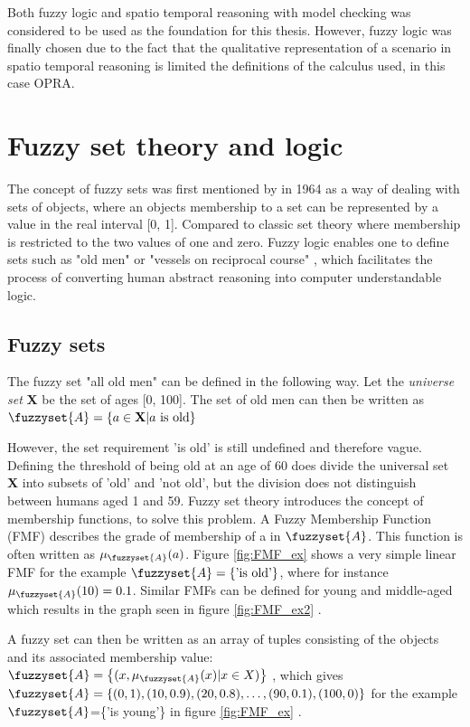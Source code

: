 Both fuzzy logic and spatio temporal reasoning with model checking was considered to be used as the foundation for this thesis. However, fuzzy logic was finally chosen due to the fact that the qualitative representation of a scenario in spatio temporal reasoning is limited the definitions of the calculus used, in this case OPRA.
\chapter{Fuzzy set theory and logic}
The concept of fuzzy sets was first mentioned by \textcite{zadeh1996fuzzy} in 1964 as a way of dealing with sets of objects, where an objects membership to a set can be represented by a value in the real interval [0, 1]. Compared to classic set theory where  membership is restricted to the two values of one and zero. Fuzzy logic enables one to define sets such as "old men" or "vessels on reciprocal course" \cite{zadeh1996fuzzy}, which facilitates the process of converting human abstract reasoning into computer understandable logic.
\section{Fuzzy sets}
The fuzzy set "all old men" can be defined in the following way. Let the \textit{universe set} \textbf{X} be the set of ages [0, 100]. The set of old men can then be written as
$\fuzzyset{A}=\left \{ a \in \textbf{X} | a \text{ is old} \right \}$
\cite{chen2000introduction}

However, the set requirement 'is old' is still undefined and therefore vague. Defining the threshold of being old at an age of 60 does divide the universal set \textbf{X} into subsets of 'old' and 'not old', but the division does not distinguish between humans aged 1 and 59.
Fuzzy set theory introduces the concept of membership functions, to solve this problem. A Fuzzy Membership Function (FMF) describes the grade of membership of a  in  $\fuzzyset{A}$. This function is often written as $\mu_{\fuzzyset{A}}(a)$. Figure \ref{fig:FMF_ex} shows a very simple linear FMF for the example $\fuzzyset{A}=\left \{\text{'is old'} \right \}$, where for instance $\mu_{\fuzzyset{A}}(10)=0.1$. Similar FMFs can be defined for young and middle-aged which results in the graph seen in figure \ref{fig:FMF_ex2} \cite{ross2009fuzzy}.

A fuzzy set can then be written as an array of tuples consisting of the objects and its associated membership value: $\fuzzyset{A}=\left \{(x,\mu_{\fuzzyset{A}}(x)|x \in X) \right \}$ \cite{zimmermann2010fuzzy}, which gives \\ $\fuzzyset{A}=\left \{(0,1),(10,0.9),(20,0.8),\dots,(90,0.1),(100,0) \right \}$ for the example $\fuzzyset{A}$=\{'is young'\} in figure \ref{fig:FMF_ex} \cite{ross2009fuzzy}.

